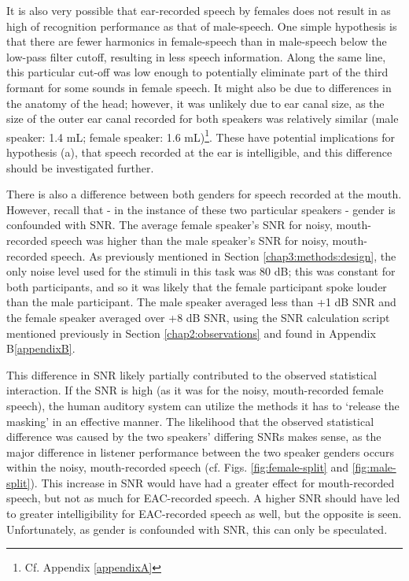 It is also very possible that ear-recorded speech by females does not result in as high of recognition performance as that of male-speech.  One simple hypothesis is that there are fewer harmonics in female-speech than in male-speech below the low-pass filter cutoff, resulting in less speech information.  Along the same line, this particular cut-off was low enough to potentially eliminate part of the third formant for some sounds in female speech.  It might also be due to differences in the anatomy of the head; however, it was unlikely due to ear canal size, as the size of the outer ear canal recorded for both speakers was relatively similar (male speaker: 1.4 mL; female speaker: 1.6 mL)\footnote{Cf. Appendix \ref{appendixA}}.  These have potential implications for hypothesis (a), that speech recorded at the ear is intelligible, and this difference should be investigated further.
%
%

There is also a difference between both genders for speech recorded at the mouth.
However, recall that - in the instance of these two particular speakers - gender is confounded with SNR.  The average female speaker's SNR for noisy, mouth-recorded speech was higher than the male speaker's SNR for noisy, mouth-recorded speech.  As previously mentioned in Section \ref{chap3:methods:design}, the only noise level used for the stimuli in this task was 80 dB; this was constant for both participants, and so it was likely that the female participant spoke louder than the male participant.  The male speaker averaged less than +1 dB SNR and the female speaker averaged over +8 dB SNR, using the SNR calculation script mentioned previously in Section \ref{chap2:observations} and found in Appendix B\ref{appendixB}.

This difference in SNR likely partially contributed to the observed statistical interaction.  If the SNR is high (as it was for the noisy, mouth-recorded female speech), the human auditory system can utilize the methods it has to `release the masking' in an effective manner.  The likelihood that the observed statistical difference was caused by the two speakers' differing SNRs makes sense, as the major difference in listener performance between the two speaker genders occurs within the noisy, mouth-recorded speech (cf. Figs. \ref{fig:female-split} and \ref{fig:male-split}).  This increase in SNR would have had a greater effect for mouth-recorded speech, but not as much for EAC-recorded speech.  A higher SNR should have led to greater intelligibility for EAC-recorded speech as well, but the opposite is seen.  Unfortunately, as gender is confounded with SNR, this can only be speculated.



